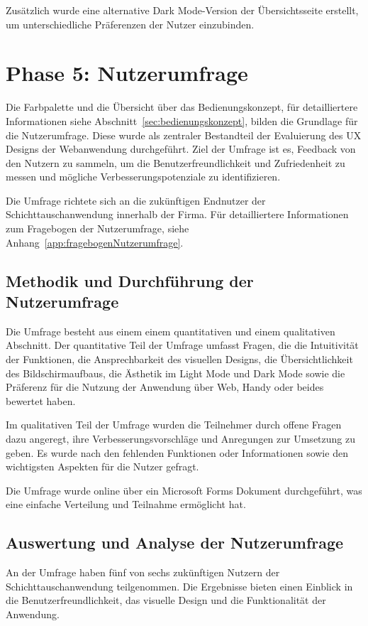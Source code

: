 Zusätzlich wurde eine alternative Dark Mode-Version der Übersichtsseite erstellt, um unterschiedliche Präferenzen der Nutzer einzubinden.

\section{Phase 5: Nutzerumfrage}
\label{chap:nutzerumfrage}
Die Farbpalette und die Übersicht über das Bedienungskonzept, für detailliertere Informationen siehe Abschnitt~\ref{sec:bedienungskonzept}, bilden die Grundlage für die Nutzerumfrage. Diese wurde als zentraler Bestandteil der Evaluierung des UX Designs der Webanwendung durchgeführt. Ziel der Umfrage ist es, Feedback von den Nutzern zu sammeln, um die Benutzerfreundlichkeit und Zufriedenheit zu messen und mögliche Verbesserungspotenziale zu identifizieren.

Die Umfrage richtete sich an die zukünftigen Endnutzer der Schichttauschanwendung innerhalb der Firma. Für detailliertere Informationen zum Fragebogen der Nutzerumfrage, siehe Anhang~\ref{app:fragebogenNutzerumfrage}.

\subsection{Methodik und Durchführung der Nutzerumfrage}

Die Umfrage besteht aus einem einem quantitativen und einem qualitativen Abschnitt. Der quantitative Teil der Umfrage umfasst Fragen, die die Intuitivität der Funktionen, die Ansprechbarkeit des visuellen Designs, die Übersichtlichkeit des Bildschirmaufbaus, die Ästhetik im Light Mode und Dark Mode sowie die Präferenz für die Nutzung der Anwendung über Web, Handy oder beides bewertet haben.

Im qualitativen Teil der Umfrage wurden die Teilnehmer durch offene Fragen dazu angeregt, ihre Verbesserungsvorschläge und Anregungen zur Umsetzung zu geben. Es wurde nach den fehlenden Funktionen oder Informationen sowie den wichtigsten Aspekten für die Nutzer gefragt.

Die Umfrage wurde online über ein Microsoft Forms Dokument durchgeführt, was eine einfache Verteilung und Teilnahme ermöglicht hat.

\subsection{Auswertung und Analyse der Nutzerumfrage}

An der Umfrage haben fünf von sechs zukünftigen Nutzern der Schichttauschanwendung teilgenommen. Die Ergebnisse bieten einen Einblick in die Benutzerfreundlichkeit, das visuelle Design und die Funktionalität der Anwendung.

